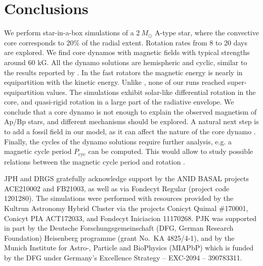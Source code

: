 \documentclass[baaa]{baaa}
\begin{document}
\section{Conclusions \label{conclusions}}
We perform star-in-a-box simulations of a $2~M_\odot$ A-type star, where the convective core corresponds to $20\%$ of the radial extent. Rotation rates from 8 to 20 days are explored. We find core dynamos with magnetic fields with typical strengths around 60 kG. All the dynamo solutions are hemispheric and cyclic, similar to the results reported by \cite{brown-2020}. In the fast rotators the magnetic energy is nearly in equipartition with the kinetic energy. Unlike \cite{Augustson-2016}, none of our runs reached super-equipartition values. The simulations exhibit solar-like differential rotation in the core, and quasi-rigid rotation in a large part of the radiative envelope. We conclude that a core dynamo is not enough to explain the observed magnetism of Ap/Bp stars, and different mechanisms should be explored. A natural next step is to add a fossil field in our model, as it can affect the nature of the core dynamo \citep{Featherstone-2009}.
Finally, the cycles of the dynamo solutions require further analysis, e.g. a magnetic cycle period $P_\mathrm{cyc}$ can be computed. This would allow to study possible relations between the magnetic cycle period and rotation \citep[see e.g.][]{Warnecke-2018, Kapyla-2022}.


\begin{acknowledgement}
JPH and DRGS gratefully acknowledge support by the ANID BASAL projects ACE210002 and FB21003, as well as via Fondecyt Regular (project code 1201280). The simulations were performed with resources provided by the Kultrun Astronomy Hybrid Cluster via the projects Conicyt Quimal \#170001, Conicyt PIA ACT172033, and Fondecyt Iniciacion 11170268. PJK was supported in part by the Deutsche Forschungsgemeinschaft (DFG,
German Research Foundation) Heisenberg programme (grant No.\ KA
4825/4-1), and by the Munich Institute for Astro-, Particle and
BioPhysics (MIAPbP) which is funded by the DFG under Germany's
Excellence Strategy – EXC-2094 – 390783311.
\end{acknowledgement}



\small

 
\end{document}
